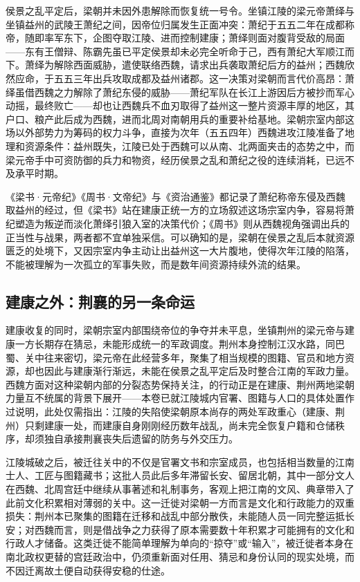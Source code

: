 侯景之乱平定后，梁朝并未因外患解除而恢复统一号令。坐镇江陵的梁元帝萧绎与坐镇益州的武陵王萧纪之间，因帝位归属发生正面冲突：萧纪于五五二年在成都称帝，随即率军东下，企图夺取江陵、进而控制建康；萧绎则面对腹背受敌的局面——东有王僧辩、陈霸先虽已平定侯景却未必完全听命于己，西有萧纪大军顺江而下。萧绎为解除西面威胁，遣使联络西魏，请求出兵袭取萧纪后方的益州；西魏欣然应命，于五五三年出兵攻取成都及益州诸郡。这一决策对梁朝而言代价高昂：萧绎虽借西魏之力解除了萧纪东侵的威胁——萧纪军队在长江上游因后方被抄而军心动摇，最终败亡——却也让西魏兵不血刃取得了益州这一整片资源丰厚的地区，其户口、粮产此后成为西魏，进而北周对南朝用兵的重要补给基地。梁朝宗室内部这场以外部势力为筹码的权力斗争，直接为次年（五五四年）西魏进攻江陵准备了地理和资源条件：益州既失，江陵已处于西魏可以从南、北两面夹击的态势之中，而梁元帝手中可资防御的兵力和物资，经历侯景之乱和萧纪之役的连续消耗，已远不及承平时期。

《梁书·元帝纪》《周书·文帝纪》与《资治通鉴》都记录了萧纪称帝东侵及西魏取益州的经过，但《梁书》站在建康正统一方的立场叙述这场宗室内争，容易将萧纪塑造为叛逆而淡化萧绎引狼入室的决策代价；《周书》则从西魏视角强调出兵的正当性与战果，两者都不宜单独采信。可以确知的是，梁朝在侯景之乱后本就资源匮乏的处境下，又因宗室内争主动让出益州这一大片腹地，使得次年江陵的陷落，不能被理解为一次孤立的军事失败，而是数年间资源持续外流的结果。

\subsection{建康之外：荆襄的另一条命运}

建康收复的同时，梁朝宗室内部围绕帝位的争夺并未平息，坐镇荆州的梁元帝与建康一方长期存在猜忌，未能形成统一的军政调度。荆州本身控制江汉水路，同巴蜀、关中往来密切，梁元帝在此经营多年，聚集了相当规模的图籍、官员和地方资源，却也因此与建康渐行渐远，未能在侯景之乱平定后及时整合江南的军政力量。西魏方面对这种梁朝内部的分裂态势保持关注，的行动正是在建康、荆州两地梁朝力量互不统属的背景下展开——本卷已就江陵城内官署、图籍与人口的具体处置作过说明，此处仅需指出：江陵的失陷使梁朝原本尚存的两处军政重心（建康、荆州）只剩建康一处，而建康自身刚刚经历数年战乱，尚未完全恢复户籍和仓储秩序，却须独自承接荆襄丧失后遗留的防务与外交压力。

江陵城破之后，被迁往关中的不仅是官署文书和宗室成员，也包括相当数量的江南士人、工匠与图籍藏书；这批人员此后多年滞留长安、留居北朝，其中一部分文人在西魏、北周宫廷中继续从事著述和礼制事务，客观上把江南的文风、典章带入了此前文化积累相对薄弱的关中。这一迁徙对梁朝一方而言是文化和行政能力的双重损失：荆州本已聚集的图籍在迁移和战乱中部分散佚，未能随人员一同完整运抵长安；对西魏而言，则是借战争之力获得了原本需要数十年积累才可能拥有的文化和行政人才储备。这类迁徙不能简单理解为单向的“掠夺”或“输入”，被迁徙者本身在南北政权更替的宫廷政治中，仍须重新面对任用、猜忌和身份认同的现实处境，而不因迁离故土便自动获得安稳的仕途。

